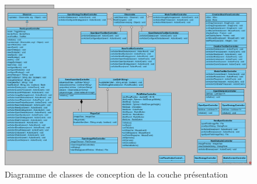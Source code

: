 \begin{figure}[htpb]
    \centering
    \includegraphics[scale=0.4]{fig/classe_conception_view.png}
    \caption{Diagramme de classes de conception de la couche présentation}
    \label{fig:vue_classes_conception_diag}
\end{figure}

